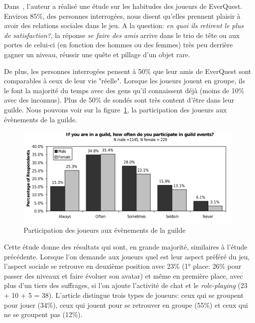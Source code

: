 Dans~\cite{StudyEQ}, l'auteur a réalisé une étude sur les habitudes des joueurs de EverQuest. Environ 85\%, des personnes interrogées, nous disent qu'elles prennent plaisir à avoir des relations sociales dans le jeu. A la question: \textit{en quoi ils retirent le plus de satisfaction?}, la réponse \textit{se faire des amis} arrive dans le trio de tête ou aux portes de celui-ci (en fonction des hommes ou des femmes) très peu derrière gagner un niveau, réussir une quête et pillage d'un objet rare.
\par De plus, les personnes interrogées pensent à 50\% que leur amis de EverQuest sont comparables à ceux de leur vie "réelle". Lorsque les joueurs jouent en groupe, ils le font la majorité du temps avec des gens qu'il connaissent déjà (moins de 10\% avec des inconnus). Plus de 50\% de sondés sont très content d'être dans leur guilde. Nous pouvons voir sur la figure~\ref{guildpres}, la participation des joueurs aux évènements de la guilde.
        \begin{figure}[!h]
        \centering
        \includegraphics[scale=0.75]{./Ressources/Images/studypres.png}
        \caption{Participation des joueurs aux évènements de la guilde}
        \label{guildpres}
        \end{figure}

Cette étude donne des résultats qui sont, en grande majorité, similaires à l'étude précédente. Lorsque l'on demande aux joueurs quel est leur aspect préféré du jeu, l'aspect sociale se retrouve en deuxième position avec 23\% (1° place: 26\% pour passer des niveaux et faire évoluer son avatar) et même en première place, avec plus d'un tiers des suffrages, si l'on ajoute l'activité de chat et le \textit{role-playing} (23 + 10 + 5 = 38). L'article distingue trois types de joueurs: ceux qui se groupent pour jouer (34\%), ceux qui jouent pour se retrouver en groupe (55\%) et ceux qui ne se groupent pas (12\%).




